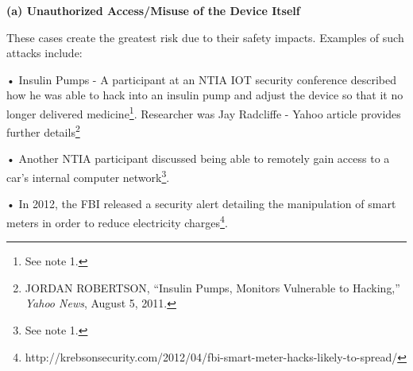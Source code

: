 \textbf{(a) Unauthorized Access/Misuse of the Device Itself}

These cases create the greatest risk due to their safety impacts.
Examples of such attacks include:

• Insulin Pumps - A participant at an NTIA IOT security conference
described how he was able to hack into an insulin pump and adjust the
device so that it no longer delivered medicine\footnote{See note 1.}.
Researcher was Jay Radcliffe - Yahoo article provides further
details\footnote{JORDAN ROBERTSON, ``Insulin Pumps, Monitors Vulnerable
  to Hacking,'' \emph{Yahoo News}, August 5, 2011.}

• Another NTIA participant discussed being able to remotely gain access
to a car's internal computer network\footnote{See note 1.}.

• In 2012, the FBI released a security alert detailing the manipulation
of smart meters in order to reduce electricity charges\footnote{http://krebsonsecurity.com/2012/04/fbi-smart-meter-hacks-likely-to-spread/}.
